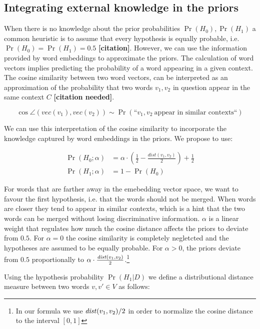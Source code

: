 \subsection{Integrating external knowledge in the priors}
When there is no knowledge about the prior probabilities $\Pr(H_0), \Pr(H_1)$ a
common heuristic is to assume that every hypothesis is equally probable, i.e.
$\Pr(H_0) = \Pr(H_1) = 0.5$ \textbf{[citation]}. However, we can use the information
provided by word embeddings to approximate the priors. The calculation of word
vectors implies predicting the probability of a word appearing in a given
context. The cosine similarity between two word vectors, can be interpreted as
an approximation of the probability that two words $v_1, v_2$ in question appear
in the same context $C$ \textbf{[citation needed]}. 

\begin{equation*}
	\cos \angle (vec(v_1), vec(v_2)) \sim \Pr(\text{``}v_1, v_2~\text{appear in
	similar contexts} \text{``})
\end{equation*}

We can use this interpretation of the cosine similarity to incorporate the
knowledge captured by word embeddings in the priors. We propose to use: 

\begin{equation*}
\begin{split}
	\Pr(H_0; \alpha) &= \alpha\cdot\left(\frac 1 2 - \frac{dist(v_1,v_2)}{2}\right)
	+ \frac 1 2
	\\
	\Pr(H_1; \alpha) &= 1 - \Pr(H_0)
\end{split}
\end{equation*}

For words that are farther away in the emebedding vector space, we want to
favour the first hypothesis, i.e. that the words should not be merged. When
words are closer they tend to appear in similar contexts, which is a hint that
the two words can be merged without losing discriminative information. $\alpha$
is a linear weight that regulates how much the cosine distance affects the
priors to deviate from $0.5$. For $\alpha=0$ the cosine similarity is completely
negletcted and the hypotheses are assumed to be equally probable. For $\alpha >
0$, the priors deviate from $0.5$ proportionally to $\alpha \cdot
\frac{\mathit{dist}(v_1,v_2)}{2}$.\footnote{In our formula we use
$\mathit{dist}(v_1,v_2)/2$ in order to normalize the cosine distance to the interval $[0, 1]$}

Using the hypothesis probability $\Pr(H_1|D)$ we define a
distributional distance measure between two words $v, v' \in V$ as follows:

